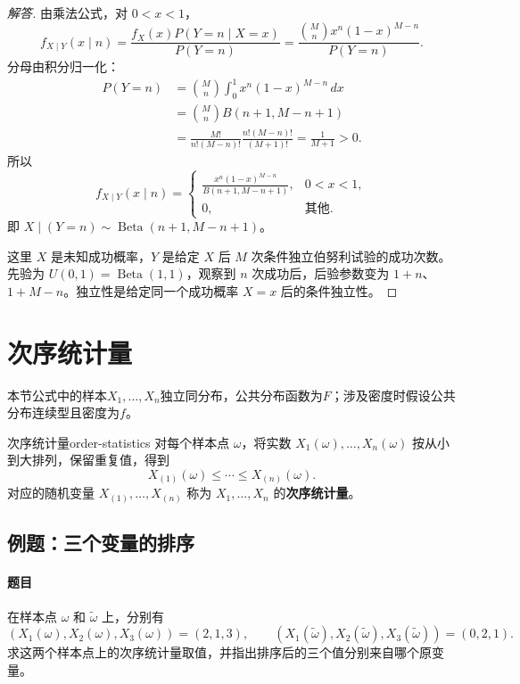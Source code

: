 \begin{proof}[解答]
由乘法公式，对 $0<x<1$，
\[
f_{X\mid Y}(x\mid n)
=\frac{f_X(x)P(Y=n\mid X=x)}{P(Y=n)}
=\frac{\binom Mn x^n(1-x)^{M-n}}{P(Y=n)}.
\]
分母由积分归一化：
\begin{align*}
P(Y=n)
&=\binom Mn\int_0^1x^n(1-x)^{M-n}\,dx\\
&=\binom Mn B(n+1,M-n+1)\\
&=\frac{M!}{n!(M-n)!}\frac{n!(M-n)!}{(M+1)!}
=\frac1{M+1}>0.
\end{align*}
所以
\[
f_{X\mid Y}(x\mid n)=
\begin{cases}
\displaystyle\frac{x^n(1-x)^{M-n}}{B(n+1,M-n+1)},&0<x<1,\\
0,&\text{其他}.
\end{cases}
\]
即 $X\mid(Y=n)\sim\operatorname{Beta}(n+1,M-n+1)$。

这里 $X$ 是未知成功概率，$Y$ 是给定 $X$ 后 $M$ 次条件独立伯努利试验的成功次数。先验为 $U(0,1)=\operatorname{Beta}(1,1)$，观察到 $n$ 次成功后，后验参数变为 $1+n$、$1+M-n$。独立性是给定同一个成功概率 $X=x$ 后的条件独立性。
\end{proof}

\clearpage\section{次序统计量}\label{k:order}
本节公式中的样本$X_1,\ldots,X_n$独立同分布，公共分布函数为$F$；涉及密度时假设公共分布连续型且密度为$f$。

\begin{mydefinition}{次序统计量}{order-statistics}
对每个样本点 $\omega$，将实数 $X_1(\omega),\ldots,X_n(\omega)$ 按从小到大排列，保留重复值，得到
\[
X_{(1)}(\omega)\leq\cdots\leq X_{(n)}(\omega).
\]
对应的随机变量 $X_{(1)},\ldots,X_{(n)}$ 称为 $X_1,\ldots,X_n$ 的\textbf{次序统计量}。
\end{mydefinition}

\subsection{例题：三个变量的排序}\label{note:c3:e15}
\paragraph{题目}
在样本点 $\omega$ 和 $\widetilde\omega$ 上，分别有
\[
(X_1(\omega),X_2(\omega),X_3(\omega))=(2,1,3),
\qquad
(X_1(\widetilde\omega),X_2(\widetilde\omega),X_3(\widetilde\omega))=(0,2,1).
\]
求这两个样本点上的次序统计量取值，并指出排序后的三个值分别来自哪个原变量。

